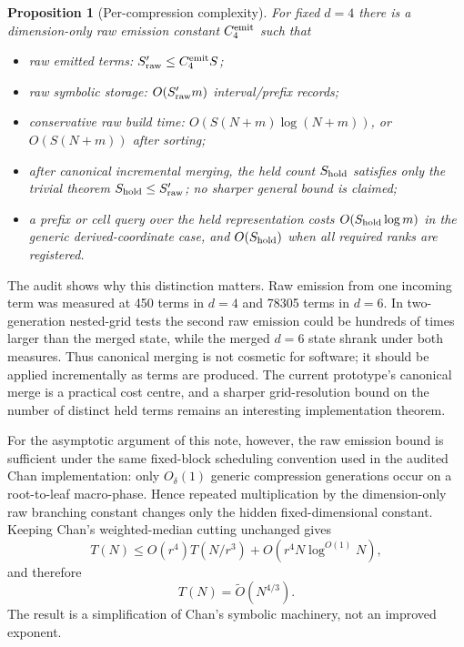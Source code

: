 \documentclass[12pt,a4paper]{article}
\newtheorem{proposition}[theorem]{Proposition}
\theoremstyle{definition}
\newcommand{\1}{\mathbf 1}
\begin{document}
\begin{proposition}[Per-compression complexity]                   \label{prop:complexity}
For fixed $d=4$ there is a dimension-only raw emission constant $C_4^{\rm emit}$ such that
\begin{itemize}[leftmargin=2em]
\item raw emitted terms: $S_{\rm raw}'\le C_4^{\rm emit}S$;
\item raw symbolic storage: $O(S_{\rm raw}'m)$ interval/prefix records;
\item conservative raw build time: $O(S(N+m)\log(N+m))$, or $O(S(N+m))$ after sorting;
\item after canonical incremental merging, the held count $S_{\rm hold}$ satisfies only the trivial theorem $S_{\rm hold}\le S_{\rm raw}'$; no sharper general bound is claimed;
\item a prefix or cell query over the held representation costs $O(S_{\rm hold}\log m)$ in the generic derived-coordinate case, and $O(S_{\rm hold})$ when all required ranks are registered.
\end{itemize}
\end{proposition}

The audit shows why this distinction matters. Raw emission from one incoming term was measured at 450 terms in $d=4$ and 78305 terms in $d=6$. In two-generation nested-grid tests the second raw emission could be hundreds of times larger than the merged state, while the merged $d=6$ state shrank under both measures. Thus canonical merging is not cosmetic for software; it should be applied incrementally as terms are produced. The current prototype's canonical merge is a practical cost centre, and a sharper grid-resolution bound on the number of distinct held terms remains an interesting implementation theorem.

For the asymptotic argument of this note, however, the raw emission bound is sufficient under the same fixed-block scheduling convention used in the audited Chan implementation: only $O_{\delta}(1)$ generic compression generations occur on a root-to-leaf macro-phase. Hence repeated multiplication by the dimension-only raw branching constant changes only the hidden fixed-dimensional constant. Keeping Chan's weighted-median cutting unchanged gives
\begin{equation}
T(N)\le O(r^4)T(N/r^3)+O(r^4N\log^{O(1)}N),                   \label{eq:newrec}
\end{equation}
and therefore
\begin{equation}
\boxed{T(N)=\widetilde O(N^{4/3}).}                            \label{eq:newtime}
\end{equation}
The result is a simplification of Chan's symbolic machinery, not an improved exponent.
\end{document}

